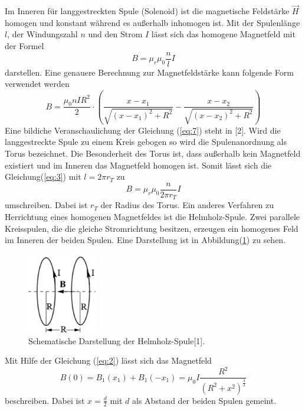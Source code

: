 Im Inneren für langgestreckten Spule (Solenoid) ist die magnetische Feldstärke $\vec{H}$
homogen und konstant während es außerhalb inhomogen ist.
Mit der Spulenlänge $l$, der Windungszahl $n$ und den Strom $I$ lässt sich das
homogene Magnetfeld mit der Formel
\begin{equation}
  B = \mu_r \mu_0 \frac{n}{l} I
  \label{eq:3}
\end{equation}
darstellen.
Eine genauere Berechnung zur Magnetfeldstärke kann folgende Form verwendet werden
\begin{equation}
  B= \frac{\mu_0 n I R^2}{2} \cdot (\frac{x-x_1}{\sqrt{(x-x_1)^2 +R^2}} - \frac{x-x_2}{\sqrt{(x-x_2)^2 +R^2}})
  \label{eq:7}
\end{equation}
Eine bildiche Veranschaulichung der Gleichung (\ref{eq:7}) steht in [2].
Wird die langgestreckte Spule zu einem Kreis gebogen so wird die Spulenanordnung
als Torus bezeichnet. Die Besonderheit des Torus ist, dass außerhalb kein Magnetfeld
existiert und im Inneren das Magnetfeld homogen ist. Somit lässt sich die Gleichung(\ref{eq:3})
mit $l= 2\pi r_T$ zu
\begin{equation}
  B = \mu_r \mu_0 \frac{n}{2\pi r_T} I
  \label{eq:4}
\end{equation}
umschreiben. Dabei ist $r_T$ der Radius des Torus.
Ein anderes Verfahren zu Herrichtung eines homogenen Magnetfeldes ist die Helmholz-Spule.
Zwei parallele Kreisspulen, die die gleiche Stromrichtung besitzen, erzeugen ein homogenes
Feld im Inneren der beiden Spulen. Eine Darstellung ist in Abbildung(\ref{abb:2}) zu sehen.
\begin{figure}[H]
  \centering
\includegraphics[width =5 cm, height = 3.5cm]{Abb2.png}
\caption{Schematische Darstellung der Helmholz-Spule[1].}
\label{abb:2}
\end{figure}
Mit Hilfe der Gleichung (\ref{eq:2}) lässt sich das Magnetfeld
\begin{equation}
  B(0)=B_1(x_1) + B_1(-x_1) = \mu_0 I \frac{R^2}{(R^2 + x^2)^{\frac{3}{2}}}
  \label{eq:5}
\end{equation}
beschreiben. Dabei ist $x=\frac{d}{2}$ mit $d$ als Abstand der beiden Spulen gemeint.\\
